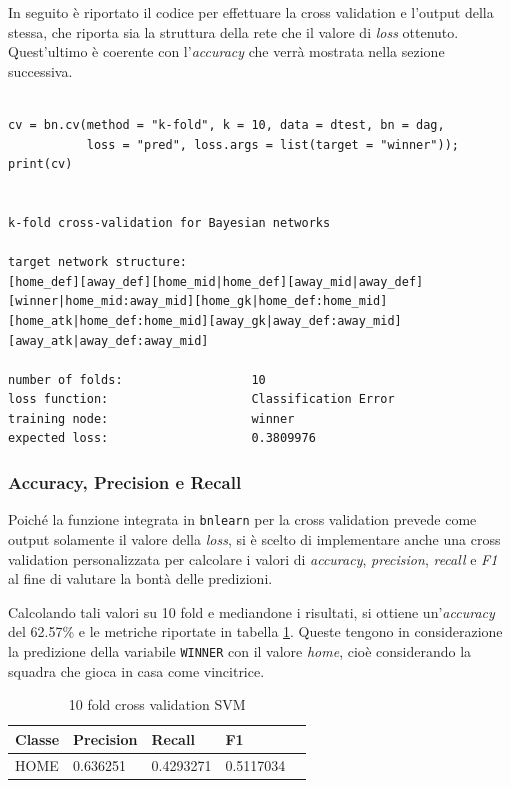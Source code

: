 \documentclass[hidelinks, 12pt]{article}
\begin{document}
In seguito è riportato il codice per effettuare la cross validation e l'output della stessa, che riporta sia la struttura della rete che il valore di \textit{loss} ottenuto. Quest'ultimo è coerente con l'\textit{accuracy} che verrà mostrata nella sezione successiva.

\begin{verbatim}

cv = bn.cv(method = "k-fold", k = 10, data = dtest, bn = dag,
           loss = "pred", loss.args = list(target = "winner"));
print(cv)


k-fold cross-validation for Bayesian networks

target network structure:
[home_def][away_def][home_mid|home_def][away_mid|away_def]
[winner|home_mid:away_mid][home_gk|home_def:home_mid]
[home_atk|home_def:home_mid][away_gk|away_def:away_mid]
[away_atk|away_def:away_mid]

number of folds:                  10 
loss function:                    Classification Error 
training node:                    winner 
expected loss:                    0.3809976 
\end{verbatim}


\subsubsection{Accuracy, Precision e Recall}

Poiché la funzione integrata in \texttt{bnlearn} per la cross validation prevede come output solamente il valore della \textit{loss}, si è scelto di implementare anche una cross validation personalizzata per calcolare i valori di \textit{accuracy}, \textit{precision}, \textit{recall} e \textit{F1} al fine di valutare la bontà delle predizioni.

Calcolando tali valori su 10 fold e mediandone i risultati, si ottiene un'\textit{accuracy} del 62.57\% e le metriche riportate in tabella \ref{tab:10-fold-bin}. Queste tengono in considerazione la predizione della variabile \texttt{WINNER} con il valore \textit{home}, cioè considerando la squadra che gioca in casa come vincitrice.

\begin{table}[H]
	\centering
	\caption{10 fold cross validation SVM}
	\begin{tabular}{l|llll}
		\hline
		Classe & Precision & Recall & F1 \\
		\hline
		HOME & 0.636251 & 0.4293271 & 0.5117034  \\
		\hline
	\end{tabular}
	\label{tab:10-fold-bin}
\end{table}
\end{document}
